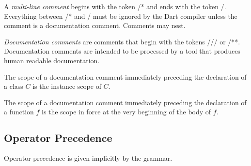 \documentclass{article}
\newcommand{\code}[1]{{\sf #1}}
\begin{document}
\LMHash{}
A {\em multi-line comment} begins with the token \code{/*} and ends with the token \code{*/}.  Everything between \code{/}* and \code{*}/ must be ignored by the Dart compiler unless the comment is a documentation comment. Comments may nest.

\LMHash{}
{\em Documentation comments} are comments that begin with the tokens  \code{///} or  \code{/**}. Documentation comments are intended to be processed by a tool that produces human readable documentation.


\LMHash{}
The scope of a documentation comment immediately preceding the declaration of a class $C$ is the instance scope of $C$.

\LMHash{}
The scope of a documentation comment immediately preceding the declaration of a function $f$  is the  scope in force at the very beginning of the body of $f$.





\subsection{Operator Precedence}

\LMHash{}
Operator precedence is given implicitly by the grammar.
\end{document}
